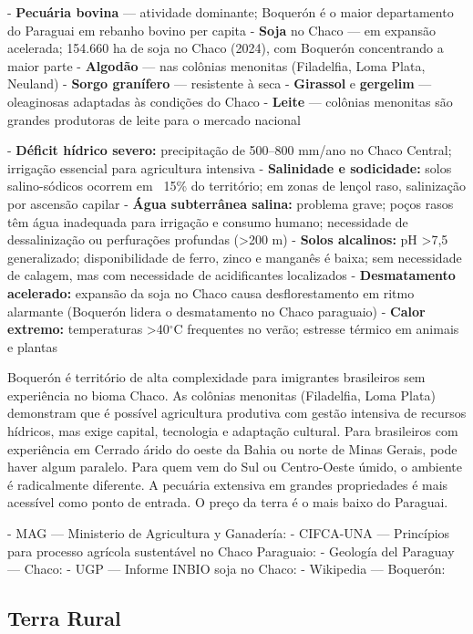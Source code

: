 - \textbf{Pecuária bovina} --- atividade dominante; Boquerón é o maior departamento do Paraguai em rebanho bovino per capita
- \textbf{Soja} no Chaco --- em expansão acelerada; 154.660 ha de soja no Chaco (2024), com Boquerón concentrando a maior parte
- \textbf{Algodão} --- nas colônias menonitas (Filadelfia, Loma Plata, Neuland)
- \textbf{Sorgo granífero} --- resistente à seca
- \textbf{Girassol} e \textbf{gergelim} --- oleaginosas adaptadas às condições do Chaco
- \textbf{Leite} --- colônias menonitas são grandes produtoras de leite para o mercado nacional


- \textbf{Déficit hídrico severo:} precipitação de 500--800 mm/ano no Chaco Central; irrigação essencial para agricultura intensiva
- \textbf{Salinidade e sodicidade:} solos salino-sódicos ocorrem em ~15\% do território; em zonas de lençol raso, salinização por ascensão capilar
- \textbf{Água subterrânea salina:} problema grave; poços rasos têm água inadequada para irrigação e consumo humano; necessidade de dessalinização ou perfurações profundas (>200 m)
- \textbf{Solos alcalinos:} pH >7,5 generalizado; disponibilidade de ferro, zinco e manganês é baixa; sem necessidade de calagem, mas com necessidade de acidificantes localizados
- \textbf{Desmatamento acelerado:} expansão da soja no Chaco causa desflorestamento em ritmo alarmante (Boquerón lidera o desmatamento no Chaco paraguaio)
- \textbf{Calor extremo:} temperaturas >40$^\circ$C frequentes no verão; estresse térmico em animais e plantas


Boquerón é território de alta complexidade para imigrantes brasileiros sem experiência no bioma Chaco. As colônias menonitas (Filadelfia, Loma Plata) demonstram que é possível agricultura produtiva com gestão intensiva de recursos hídricos, mas exige capital, tecnologia e adaptação cultural. Para brasileiros com experiência em Cerrado árido do oeste da Bahia ou norte de Minas Gerais, pode haver algum paralelo. Para quem vem do Sul ou Centro-Oeste úmido, o ambiente é radicalmente diferente. A pecuária extensiva em grandes propriedades é mais acessível como ponto de entrada. O preço da terra é o mais baixo do Paraguai.


- MAG --- Ministerio de Agricultura y Ganadería: 
- CIFCA-UNA --- Princípios para processo agrícola sustentável no Chaco Paraguaio: 
- Geología del Paraguay --- Chaco: 
- UGP --- Informe INBIO soja no Chaco: 
- Wikipedia --- Boquerón: 


\subsection{Terra Rural}



